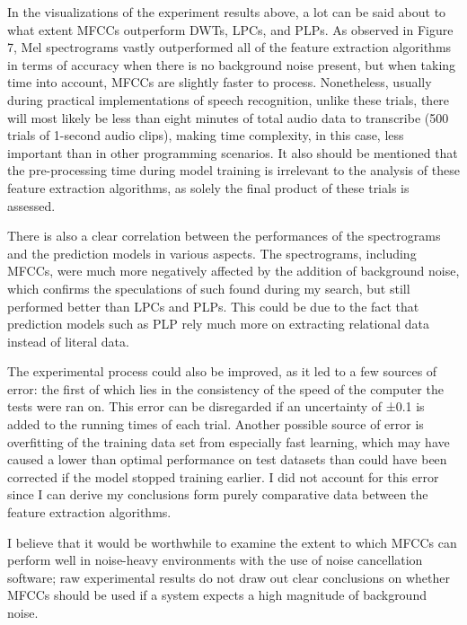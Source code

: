 In the visualizations of the experiment results above, a lot can be said about to what extent MFCCs outperform DWTs, LPCs, and PLPs. As observed in Figure 7, Mel spectrograms vastly outperformed all of the feature extraction algorithms in terms of accuracy when there is no background noise present, but when taking time into account, MFCCs are slightly faster to process. Nonetheless, usually during practical implementations of speech recognition, unlike these trials, there will most likely be less than eight minutes of total audio data to transcribe (500 trials of 1-second audio clips), making time complexity, in this case, less important than in other programming scenarios. It also should be mentioned that the pre-processing time during model training is irrelevant to the analysis of these feature extraction algorithms, as solely the final product of these trials is assessed.
\newline\par
There is also a clear correlation between the performances of the spectrograms and the prediction models in various aspects. The spectrograms, including MFCCs, were much more negatively affected by the addition of background noise, which confirms the speculations of such found during my search, but still performed better than LPCs and PLPs. This could be due to the fact that prediction models such as PLP rely much more on extracting relational data instead of literal data.
\newline\par
The experimental process could also be improved, as it led to a few sources of error: the first of which lies in the consistency of the speed of the computer the tests were ran on. This error can be disregarded if an uncertainty of ±0.1 is added to the running times of each trial. Another possible source of error is overfitting of the training data set from especially fast learning, which may have caused a lower than optimal performance on test datasets than could have been corrected if the model stopped training earlier. I did not account for this error since I can derive my conclusions form purely comparative data between the feature extraction algorithms.
\newline\par
I believe that it would be worthwhile to examine the extent to which MFCCs can perform well in noise-heavy environments with the use of noise cancellation software; raw experimental results do not draw out clear conclusions on whether MFCCs should be used if a system expects a high magnitude of background noise.

